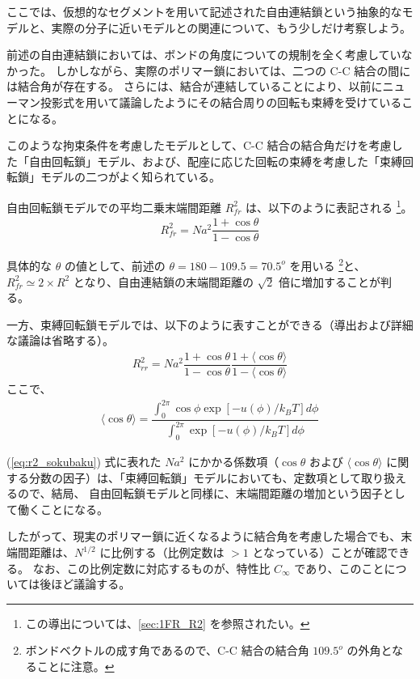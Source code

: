 \documentclass[a4paper,11pt]{ltjsarticle}
\begin{document}
ここでは、仮想的なセグメントを用いて記述された自由連結鎖という抽象的なモデルと、実際の分子に近いモデルとの関連について、もう少しだけ考察しよう。

前述の自由連結鎖においては、ボンドの角度についての規制を全く考慮していなかった。
しかしながら、実際のポリマー鎖においては、二つの C-C 結合の間には結合角が存在する。
さらには、結合が連結していることにより、以前にニューマン投影式を用いて議論したようにその結合周りの回転も束縛を受けていることになる。

このような拘束条件を考慮したモデルとして、C-C 結合の結合角だけを考慮した「自由回転鎖」モデル、および、配座に応じた回転の束縛を考慮した「束縛回転鎖」モデルの二つがよく知られている。

自由回転鎖モデルでの平均二乗末端間距離 $R_{fr}^2$ は、以下のように表記される
\footnote
{
この導出については、\ref{sec:1FR_R2} を参照されたい。
}。
\begin{align}
R_{fr}^2 = Na^2 \dfrac{1+\cos \theta}{1-\cos \theta}
\label{eq:r2_sokubaku}
\end{align}

具体的な $\theta$ の値として、前述の $\theta = 180-109.5= 70.5^o$ を用いる
\footnote
{
ボンドベクトルの成す角であるので、C-C 結合の結合角 $109.5^o$ の外角となることに注意。
}と、$R_{fr}^2 \simeq 2 \times R^2$ となり、自由連結鎖の末端間距離の $\sqrt{2}$ 倍に増加することが判る。


一方、束縛回転鎖モデルでは、以下のように表すことができる（導出および詳細な議論は省略する）。
\begin{align}
R_{rr}^2 = Na^2 \dfrac{1+\cos \theta}{1-\cos \theta} \dfrac{1+ \langle \cos \theta \rangle}{1- \langle \cos \theta \rangle}
\label{eq:r2_sokubaku}
\end{align}
ここで、
\begin{align}
\langle \cos \theta \rangle = \dfrac{\displaystyle \int_0^{2 \pi} \cos \phi \exp [-u(\phi)/k_B T] d \phi}{\displaystyle \int_0^{2\pi} \exp [-u(\phi)/k_B T] d \phi}
\end{align}

(\ref{eq:r2_sokubaku}) 式に表れた $Na^2$ にかかる係数項（$\cos \theta$ および $\langle \cos \theta \rangle$ に関する分数の因子）は、「束縛回転鎖」モデルにおいても、定数項として取り扱えるので、結局、
自由回転鎖モデルと同様に、末端間距離の増加という因子として働くことになる。

したがって、現実のポリマー鎖に近くなるように結合角を考慮した場合でも、末端間距離は、$N^{1/2}$ に比例する（比例定数は $> 1$ となっている）ことが確認できる。
なお、この比例定数に対応するものが、特性比 $C_{\infty}$ であり、このことについては後ほど議論する。
\end{document}
